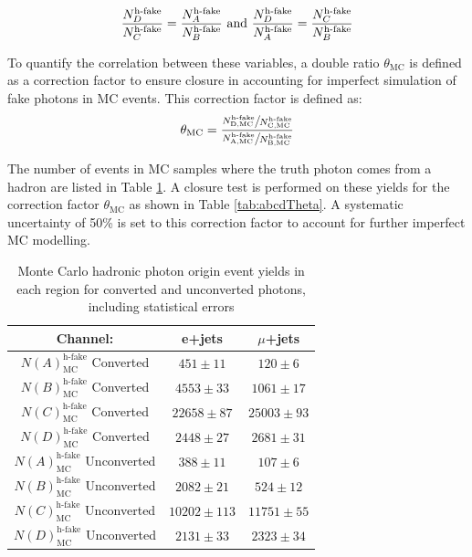 \[\frac{N_D^{\text{h-fake}}}{N_C^{\text{h-fake}}}=\frac{N_A^{\text{h-fake}}}{N_B^{\text{h-fake}}}
\\ \text{ and } \\
\frac{N_D^{\text{h-fake}}}{N_A^{\text{h-fake}}}=\frac{N_C^{\text{h-fake}}}{N_B^{\text{h-fake}}}
\]

To quantify the correlation between these variables, a double ratio $\theta_{\text{MC}}$ is defined as a correction factor to ensure closure in accounting for imperfect simulation of fake photons in MC events. This correction factor is defined as:
\[\theta_{\text{MC}}=\frac
{\sfrac{N_\text{D,MC}^{\text{h-fake}}}{N_\text{C,MC}^{\text{h-fake}}}}
{\sfrac{N_\text{A,MC}^{\text{h-fake}}}{N_\text{B,MC}^{\text{h-fake}}}}
\]
 
 The number of events in MC samples where the truth photon comes from a hadron are listed in Table \ref{tab:abcdYieldsMC}.  A closure test is performed on these yields for the correction factor $\theta_\text{MC}$ as shown in Table \ref{tab:abcdTheta}.  A systematic uncertainty of 50\% is set to this correction factor to account for further imperfect MC modelling.
\begin{table}[h]
\begin{center}
{\renewcommand{\arraystretch}{1.2}
\begin{tabular}{c|c|c}
\hline
Channel:     &  e+jets   &$\mu$+jets \\  \hline 
$N(A)^\text{h-fake}_\text{MC}$ Converted & $451 \pm 11 $   &  $120\pm 6$	\\ 
$N(B)^\text{h-fake}_\text{MC}$ Converted & $4553 \pm 33 $   &  $1061\pm 17 $      \\ 
$N(C)^\text{h-fake}_\text{MC}$ Converted & $22658 \pm 87 $   &  $25003\pm 93 $    \\ 
$N(D)^\text{h-fake}_\text{MC}$ Converted & $2448 \pm 27 $   &  $2681\pm 31$      \\ \hline %
$N(A)^\text{h-fake}_\text{MC}$ Unconverted & $388\pm 11$         &  $107\pm 6$	\\ 
$N(B)^\text{h-fake}_\text{MC}$ Unconverted & $2082\pm 21$       &  $524 \pm 12$       \\ 
$N(C)^\text{h-fake}_\text{MC}$ Unconverted & $10202\pm 113$   &  $11751\pm55$     \\ 
$N(D)^\text{h-fake}_\text{MC}$ Unconverted & $2131\pm33$        &  $2323 \pm 34$       \\ \hline
\end{tabular}
\caption{Monte Carlo hadronic photon origin event yields in each region for converted and unconverted photons, including statistical errors  }
\label{tab:abcdYieldsMC}
}
\end{center}
\end{table}

